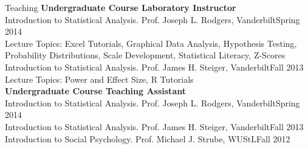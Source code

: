 \documentclass {resume}
\begin{document}
\begin{rSection}{\textrm{Teaching
}}
{\large {\bf Undergraduate Course Laboratory Instructor}\\}
Introduction to Statistical Analysis. Prof. Joseph L. Rodgers, Vanderbilt\hfill  {Spring 2014}\\
\hspace* {6 mm}Lecture Topics: Excel Tutorials, Graphical Data Analysis, Hypothesis Testing,\\
\hspace* {6 mm}Probability Distributions, Scale Development, Statistical Literacy, Z-Scores%
\smallskip\\
Introduction to Statistical Analysis. Prof. James H. Steiger, Vanderbilt\hfill  {Fall 2013}\\
\hspace* {6 mm}Lecture Topics: Power and Effect Size, R Tutorials\medskip\\
{\large {\bf Undergraduate Course Teaching Assistant}}\\
Introduction to Statistical Analysis. Prof. Joseph L. Rodgers, Vanderbilt\hfill  {Spring 2014}\smallskip\\
Introduction to Statistical Analysis. Prof. James H. Steiger, Vanderbilt\hfill  {Fall 2013}\smallskip\\
Introduction to Social Psychology. Prof. Michael J. Strube, WUStL\hfill  {Fall 2012}
\end{rSection}
\end{document}
